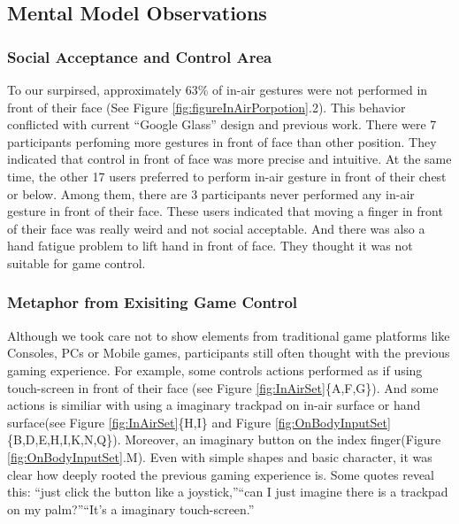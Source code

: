 \documentclass{sigchi}
\begin{document}
  \subsection{Mental Model Observations}
    \subsubsection{Social Acceptance and Control Area}
    To our surpirsed, approximately 63\% of in-air gestures were not performed in front of their face (See Figure \ref{fig:figureInAirPorpotion}.2). This behavior conflicted with current ``Google Glass'' design and previous work\cite{Colaco:2013:MCL:2501988.2502042}. There were 7 participants perfoming more gestures in front of face than other position. They indicated that control in front of face was more precise and intuitive. At the same time, the other 17 users preferred to perform in-air gesture in front of their chest or below. Among them, there are 3 participants never performed any in-air gesture in front of their face. These users indicated that moving a finger in front of their face was really weird and not social acceptable. And there was also a hand fatigue problem to lift hand in front of face. They thought it was not suitable for game control.

    \subsubsection{Metaphor from Exisiting Game Control}
    Although we took care not to show elements from traditional game platforms like Consoles, PCs or Mobile games, participants still often thought with the previous gaming experience. For example, some controls actions performed as if using touch-screen in front of their face (see Figure \ref{fig:InAirSet}\{A,F,G\}). And some actions is similiar with using a imaginary trackpad on in-air surface or hand surface(see Figure \ref{fig:InAirSet}\{H,I\} and Figure \ref{fig:OnBodyInputSet}\{B,D,E,H,I,K,N,Q\}). Moreover, an imaginary button on the index finger(Figure \ref{fig:OnBodyInputSet}.M). Even with simple shapes and basic character, it was clear how deeply rooted the previous gaming experience is. Some quotes reveal this: ``just click the button like a joystick,''``can I just imagine there is a trackpad on my palm?''``It's a imaginary touch-screen.''
\end{document}
